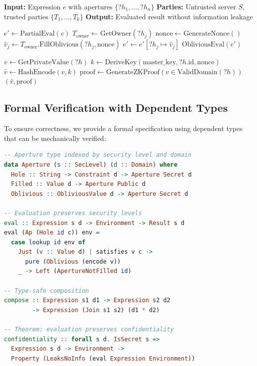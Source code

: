 \documentclass[12pt]{article}
\begin{document}
\begin{algorithm}
\caption{Secure Multi-Party Aperture Evaluation}
\label{alg:secure-aperture}
\begin{algorithmic}[1]
\State \textbf{Input:} Expression $e$ with apertures $\{?h_1, \ldots, ?h_n\}$
\State \textbf{Parties:} Untrusted server $S$, trusted parties $\{T_1, \ldots, T_k\}$
\State \textbf{Output:} Evaluated result without information leakage

    \State $e' \gets \text{PartialEval}(e)$ 
        \State $T_{\text{owner}} \gets \text{GetOwner}(?h_j)$
        \State $\text{nonce} \gets \text{GenerateNonce}()$
        \State $\hat{v}_j \gets T_{\text{owner}}.\text{FillOblivious}(?h_j, \text{nonce})$
        \State $e' \gets e'[?h_j \mapsto \hat{v}_j]$ 
    \EndFor
    \State \Return $\text{ObliviousEval}(e')$ 
\EndProcedure

    \State $v \gets \text{GetPrivateValue}(?h)$
    \State $k \gets \text{DeriveKey}(\text{master\_key}, ?h.\text{id}, \text{nonce})$
    \State $\hat{v} \gets \text{HashEncode}(v, k)$ 
    \State $\text{proof} \gets \text{GenerateZKProof}(v \in \text{ValidDomain}(?h))$
    \State \Return $(\hat{v}, \text{proof})$
\EndProcedure
\end{algorithmic}
\end{algorithm}

\subsection{Formal Verification with Dependent Types}

To ensure correctness, we provide a formal specification using dependent types that can be mechanically verified:

\begin{lstlisting}[language=Haskell]
-- Aperture type indexed by security level and domain
data Aperture (s :: SecLevel) (d :: Domain) where
  Hole :: String -> Constraint d -> Aperture Secret d
  Filled :: Value d -> Aperture Public d
  Oblivious :: ObliviousValue d -> Aperture Secret d

-- Evaluation preserves security levels
eval :: Expression s d -> Environment -> Result s d
eval (Ap (Hole id c)) env = 
  case lookup id env of
    Just (v :: Value d) | satisfies v c -> 
      pure (Oblivious (encode v))
    _ -> Left (ApertureNotFilled id)

-- Type-safe composition
compose :: Expression s1 d1 -> Expression s2 d2 
        -> Expression (Join s1 s2) (d1 * d2)

-- Theorem: evaluation preserves confidentiality
confidentiality :: forall s d. IsSecret s => 
  Expression s d -> Environment -> 
  Property (LeaksNoInfo (eval Expression Environment))
\end{lstlisting}
\end{document}
